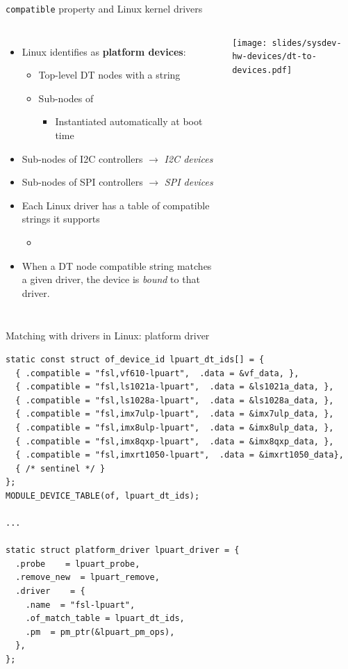 \begin{frame}{{\tt compatible} property and Linux kernel drivers}
  \begin{columns}
    \begin{itemize}
    \item Linux identifies as {\bf platform devices}:
      \begin{itemize}
      \item Top-level DT nodes with a  string
      \item Sub-nodes of 
        \begin{itemize}
        \item Instantiated automatically at boot time
        \end{itemize}
      \end{itemize}
    \item Sub-nodes of I2C controllers $\rightarrow$ {\em I2C devices}
    \item Sub-nodes of SPI controllers $\rightarrow$ {\em SPI devices}
    \item Each Linux driver has a table of compatible strings it supports
      \begin{itemize}
      \item {}\code{[]}
      \end{itemize}
    \item When a DT node compatible string matches a given driver, the
      device is {\em bound} to that driver.
    \end{itemize}
    \texttt{[image: slides/sysdev-hw-devices/dt-to-devices.pdf]}
  \end{columns}
\end{frame}

\begin{frame}[fragile]{Matching with drivers in Linux: platform driver}
  \begin{block}{}
    {\tiny
\begin{verbatim}
static const struct of_device_id lpuart_dt_ids[] = {
  { .compatible = "fsl,vf610-lpuart",  .data = &vf_data, },
  { .compatible = "fsl,ls1021a-lpuart",  .data = &ls1021a_data, },
  { .compatible = "fsl,ls1028a-lpuart",  .data = &ls1028a_data, },
  { .compatible = "fsl,imx7ulp-lpuart",  .data = &imx7ulp_data, },
  { .compatible = "fsl,imx8ulp-lpuart",  .data = &imx8ulp_data, },
  { .compatible = "fsl,imx8qxp-lpuart",  .data = &imx8qxp_data, },
  { .compatible = "fsl,imxrt1050-lpuart",  .data = &imxrt1050_data},
  { /* sentinel */ }
};
MODULE_DEVICE_TABLE(of, lpuart_dt_ids);

...

static struct platform_driver lpuart_driver = {
  .probe    = lpuart_probe,
  .remove_new  = lpuart_remove,
  .driver    = {
    .name  = "fsl-lpuart",
    .of_match_table = lpuart_dt_ids,
    .pm  = pm_ptr(&lpuart_pm_ops),
  },
};
\end{verbatim}
    }
  \end{block}
\end{frame}


